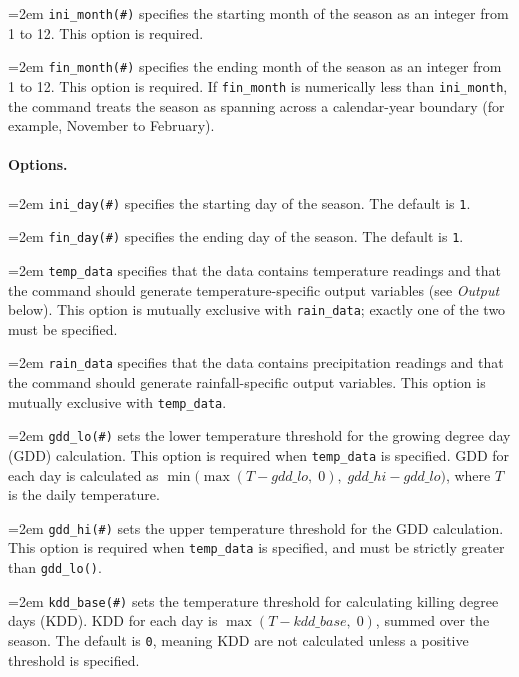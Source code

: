 \hangindent=2em
\texttt{ini\_month(\textit{\#})} specifies the starting month of the season as an integer from 1 to 12. This option is required.

\hangindent=2em
\texttt{fin\_month(\textit{\#})} specifies the ending month of the season as an integer from 1 to 12. This option is required. If \texttt{fin\_month} is numerically less than \texttt{ini\_month}, the command treats the season as spanning across a calendar-year boundary (for example, November to February).

\paragraph{Options.}

\hangindent=2em
\texttt{ini\_day(\textit{\#})} specifies the starting day of the season. The default is \texttt{1}.

\hangindent=2em
\texttt{fin\_day(\textit{\#})} specifies the ending day of the season. The default is \texttt{1}.

\hangindent=2em
\texttt{temp\_data} specifies that the data contains temperature readings and that the command should generate temperature-specific output variables (see \emph{Output} below). This option is mutually exclusive with \texttt{rain\_data}; exactly one of the two must be specified.

\hangindent=2em
\texttt{rain\_data} specifies that the data contains precipitation readings and that the command should generate rainfall-specific output variables. This option is mutually exclusive with \texttt{temp\_data}.

\hangindent=2em
\texttt{gdd\_lo(\textit{\#})} sets the lower temperature threshold for the growing degree day (GDD) calculation. This option is required when \texttt{temp\_data} is specified. GDD for each day is calculated as $\min\bigl(\max(T - \mathit{gdd\_lo},\; 0),\; \mathit{gdd\_hi} - \mathit{gdd\_lo}\bigr)$, where $T$ is the daily temperature.

\hangindent=2em
\texttt{gdd\_hi(\textit{\#})} sets the upper temperature threshold for the GDD calculation. This option is required when \texttt{temp\_data} is specified, and must be strictly greater than \texttt{gdd\_lo()}.

\hangindent=2em
\texttt{kdd\_base(\textit{\#})} sets the temperature threshold for calculating killing degree days (KDD). KDD for each day is $\max(T - \mathit{kdd\_base},\; 0)$, summed over the season. The default is \texttt{0}, meaning KDD are not calculated unless a positive threshold is specified.

